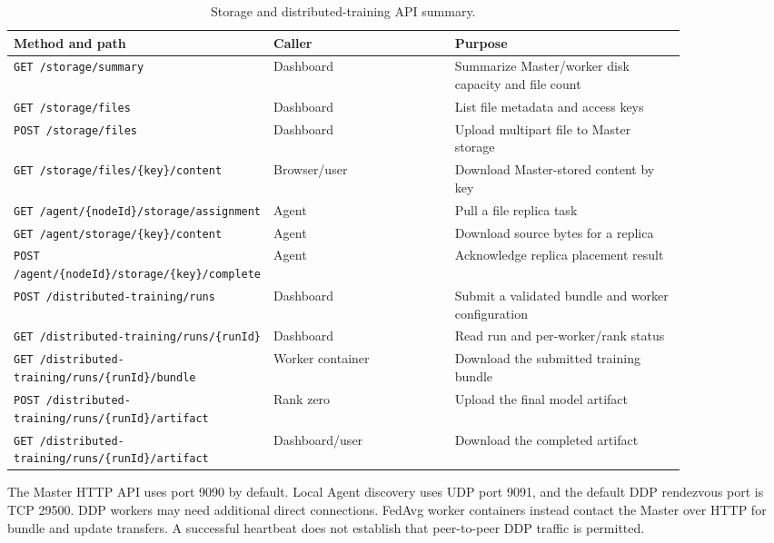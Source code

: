 \documentclass{article}
\begin{document}
\begin{table}[h!]
\centering
\caption{Storage and distributed-training API summary.}
\label{tab:api-storage}
\begin{tabular}{|p{0.22\linewidth}|p{0.28\linewidth}|p{0.36\linewidth}|}
\hline
Method and path & Caller & Purpose \\
\hline
\texttt{GET /storage/summary} & Dashboard & Summarize Master/worker disk capacity and file count \\
\hline
\texttt{GET /storage/files} & Dashboard & List file metadata and access keys \\
\hline
\texttt{POST /storage/files} & Dashboard & Upload multipart file to Master storage \\
\hline
\texttt{GET /storage/files/\{key\}/content} & Browser/user & Download Master-stored content by key \\
\hline
\texttt{GET /agent/\{nodeId\}/storage/assignment} & Agent & Pull a file replica task \\
\hline
\texttt{GET /agent/storage/\{key\}/content} & Agent & Download source bytes for a replica \\
\hline
\texttt{POST /agent/\{nodeId\}/storage/\{key\}/complete} & Agent & Acknowledge replica placement result \\
\hline
\texttt{POST /distributed-training/runs} & Dashboard & Submit a validated bundle and worker configuration \\
\hline
\texttt{GET /distributed-training/runs/\{runId\}} & Dashboard & Read run and per-worker/rank status \\
\hline
\texttt{GET /distributed-training/runs/\{runId\}/bundle} & Worker container & Download the submitted training bundle \\
\hline
\texttt{POST /distributed-training/runs/\{runId\}/artifact} & Rank zero & Upload the final model artifact \\
\hline
\texttt{GET /distributed-training/runs/\{runId\}/artifact} & Dashboard/user & Download the completed artifact \\
\hline
\end{tabular}
\end{table}

The Master HTTP API uses port 9090 by default. Local Agent discovery uses UDP port 9091, and the default DDP rendezvous port is TCP 29500. DDP workers may need additional direct connections. FedAvg worker containers instead contact the Master over HTTP for bundle and update transfers. A successful heartbeat does not establish that peer-to-peer DDP traffic is permitted.
\end{document}
